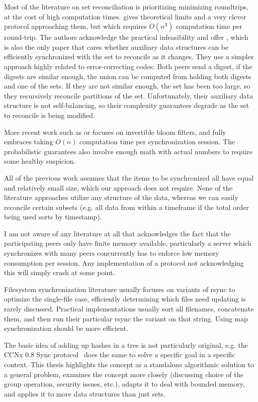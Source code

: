 \documentclass{article}
\begin{document}
Most of the literature on set reconciliation is prioritizing minimizing roundtrips, at the cost of high computation times. \cite{minsky2003set} gives theoretical limits and a very clever protocol approaching them, but which requires $O(n^3)$ computation time per round-trip. The authors acknowledge the practical infeasibility and offer \cite{minsky2002practical}, which is also the only paper that cares whether auxiliary data structures can be efficiently synchronized with the set to reconcile as it changes. They use a simpler approach highly related to error-correcting codes: Both peers send a digest, if the digests are similar enough, the union can be computed from holding both digests and one of the sets. If they are not similar enough, the set has been too large, so they recursively reconcile partitions of the set. Unfortunately, their auxiliary data structure is not self-balancing, so their complexity guarantees degrade as the set to reconcile is being modified.

More recent work such as \cite{eppstein2011s} or \cite{ozisik2019graphene} focuses on invertible bloom filters, and fully embraces taking $O(n)$ computation time per synchronization session. The probabilistic guarantees also involve enough math with actual numbers to require some healthy suspicion.

All of the previous work assumes that the items to be synchronized all have equal and relatively small size, which our approach does not require. None of the literature approaches utilize any structure of the data, whereas we can easily reconcile certain subsets (e.g. all data from within a timeframe if the total order being used sorts by timestamp).

I am not aware of any literature at all that acknowledges the fact that the participating peers only have finite memory available, particularly a server which synchronizes with many peers concurrently has to enforce low memory consumption per session. Any implementation of a protocol not acknowledging this will simply crash at some point.

Filesystem synchronization literature usually focuses on variants of rsync to optimize the single-file case, efficiently determining which files need updating is rarely discussed. Practical implementations usually sort all filenames, concatenate them, and then run their particular rsync the variant on that string. Using map synchronization should be more efficient.

The basic idea of adding up hashes in a tree is not particularly original, e.g. the CCNx  0.8 Sync protocol~\cite{shang2017survey} does the same to solve a specific goal in a specific context.  This thesis highlights the concept as a standalone algorithmic solution to a general problem, examines the concept more closely (discussing choice of the group operation, security issues, etc.), adapts it to deal with bounded memory, and applies it to more data structures than just sets.
\end{document}
